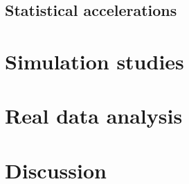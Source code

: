 \documentclass[12pt]{article}
\begin{document}
\subsection{Statistical accelerations}


\section{Simulation studies}

\section{Real data analysis}

\section{Discussion}
\end{document}
